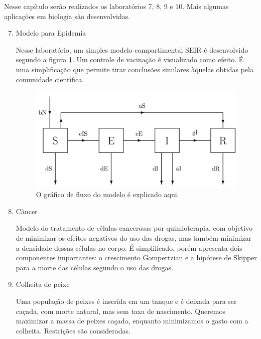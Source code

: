 Nesse capítulo serão realizados os laboratórios 7, 8, 9 e 10. Mais algumas
aplicações em biologia são desenvolvidas.

\begin{enumerate}[label=\textbf{Lab \arabic*:}]
    \setcounter{enumi}{6}

    \item Modelo para Epidemia 
    
    Nesse laboratório, um simples modelo compartimental SEIR é desenvolvido
    segundo a figura \ref{fig1:seir}. Um controle de vacinação é visualizado
    como  efeito. É uma simplificação que permite tirar conclusões similares
    àquelas obtidas pela comunidade científica. 

    \begin{figure}[hb]
        \center
        \includegraphics[width = \textwidth]{../images/flow-chat-seir.png}
        \caption{O gráfico de fluxo do modelo é explicado aqui.}
        \label{fig1:seir}
    \end{figure}

    \item Câncer
    
    Modelo do tratamento de células cancerosas por quimioterapia, com objetivo
    de minimizar os efeitos negativos do uso das drogas, mas também minimizar
    a densidade dessas células no corpo. É simplificado, porém apresenta dois
    componentes importantes: o crescimento Gompertzian e a hipótese de Skipper
    para a morte das células segundo o uso das drogas. 

    \item Colheita de peixe  
    
    Uma população de peixes é inserida em um tanque e é deixada para ser
    caçada, com morte natural, mas sem taxa de nascimento. Queremos maximizar
    a massa de peixes caçada, enquanto minimizamos o gasto com a colheita.
    Restrições são consideradas. 
 
\end{enumerate}